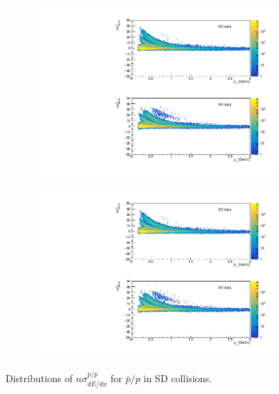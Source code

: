 \begin{figure}[H]
{			\begin{subfigure}[b]{\linewidth}{
					{\includegraphics[width=\linewidth, page=34]{graphics/pid/spectraFit_SDT.pdf}}}
			\end{subfigure}
		}	
	\parbox{0.3\textwidth}{
			\centering
			\begin{subfigure}[b]{\linewidth}{
					{\includegraphics[width=\linewidth, page=35]{graphics/pid/spectraFit_SDT.pdf}}}
			\end{subfigure}
		}	
	\caption[Distributions of $n\sigma^{\bar{p}/p}_{dE/dx}$ for $\bar{p}/p$ in SD collisions]{Distributions of $n\sigma^{\bar{p}/p}_{dE/dx}$ for $\bar{p}/p$ in SD collisions.}
	\label{fig:nsigmapfit}
\end{figure}
